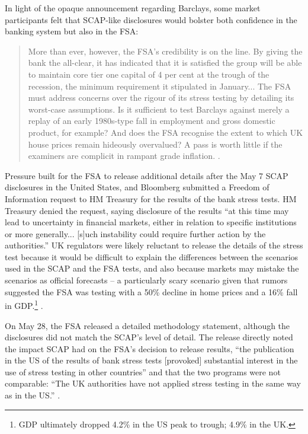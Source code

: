 \documentclass[12pt]{article}
\begin{document}
In light of the opaque announcement regarding Barclays, some market participants felt that SCAP-like disclosures would bolster both confidence in the banking system but also in the FSA:

\begin{quote}
	More than ever, however, the FSA’s credibility is on the line. By giving the bank the all-clear, it has indicated that it is satisfied the group will be able to maintain core tier one capital of 4 per cent at the trough of the recession, the minimum requirement it stipulated in January... The FSA must address concerns over the rigour of its stress testing by detailing its worst-case assumptions. Is it sufficient to test Barclays against merely a replay of an early 1980s-type fall in employment and gross domestic product, for example? And does the FSA recognise the extent to which UK house prices remain hideously overvalued? A pass is worth little if the examiners are complicit in rampant grade inflation. \citep{Lex}.
\end{quote}

Pressure built for the FSA to release additional details after the May 7 SCAP disclosures in the United States, and Bloomberg submitted a Freedom of Information request to HM Treasury for the results of the bank stress tests. HM Treasury denied the request, saying disclosure of the results ``at this time may lead to uncertainty in financial markets, either in relation to specific institutions or more generally... [s]uch instability could require further action by the authorities.''  UK regulators were likely reluctant to release the details of the stress test because it would be difficult to explain the differences between the scenarios used in the SCAP and the FSA tests, and also because markets may mistake the scenarios as official forecasts -- a particularly scary scenario given that rumors suggested the FSA was testing with a 50\% decline in home prices and a 16\% fall in GDP.\footnote{GDP ultimately dropped 4.2\% in the US peak to trough; 4.9\% in the UK.} \citep{Murphy}. 

On May 28, the FSA released a detailed methodology statement, although the disclosures did not match the SCAP's level of detail. The release directly noted the impact SCAP had on the FSA's decision to release results, ``the publication in the US of the results of bank stress tests [provoked] substantial interest in the use of stress testing in other countries'' and that the two programs were not comparable: ``The UK authorities have not applied stress testing in the same way as in the US.'' \citep{Results}. 
\end{document}
